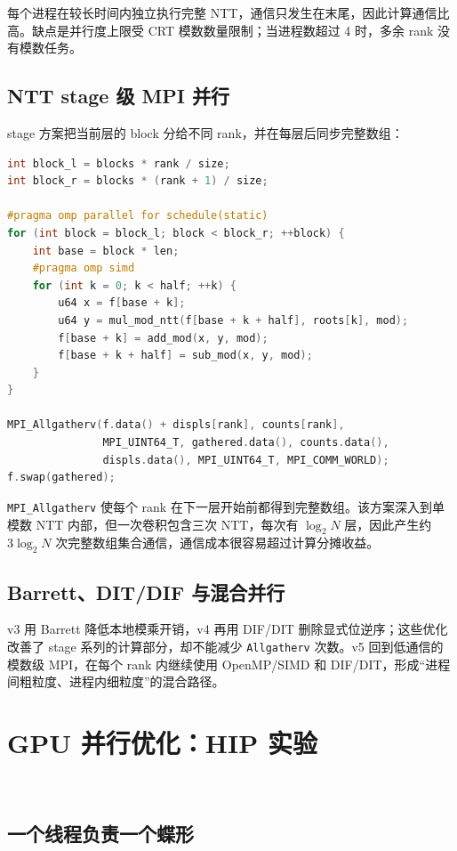 每个进程在较长时间内独立执行完整 NTT，通信只发生在末尾，因此计算通信比高。缺点是并行度上限受 CRT 模数数量限制；当进程数超过 4 时，多余 rank 没有模数任务。

\subsection{NTT stage 级 MPI 并行}

stage 方案把当前层的 block 分给不同 rank，并在每层后同步完整数组：

\begin{lstlisting}[title=stage级MPI蝶形与层间同步,label={lst:mpi-stage},language={C++}]
int block_l = blocks * rank / size;
int block_r = blocks * (rank + 1) / size;

#pragma omp parallel for schedule(static)
for (int block = block_l; block < block_r; ++block) {
    int base = block * len;
    #pragma omp simd
    for (int k = 0; k < half; ++k) {
        u64 x = f[base + k];
        u64 y = mul_mod_ntt(f[base + k + half], roots[k], mod);
        f[base + k] = add_mod(x, y, mod);
        f[base + k + half] = sub_mod(x, y, mod);
    }
}

MPI_Allgatherv(f.data() + displs[rank], counts[rank],
               MPI_UINT64_T, gathered.data(), counts.data(),
               displs.data(), MPI_UINT64_T, MPI_COMM_WORLD);
f.swap(gathered);
\end{lstlisting}

\texttt{MPI\_Allgatherv} 使每个 rank 在下一层开始前都得到完整数组。该方案深入到单模数 NTT 内部，但一次卷积包含三次 NTT，每次有 $\log_2N$ 层，因此产生约 $3\log_2N$ 次完整数组集合通信，通信成本很容易超过计算分摊收益。

\subsection{Barrett、DIT/DIF 与混合并行}

v3 用 Barrett 降低本地模乘开销，v4 再用 DIF/DIT 删除显式位逆序；这些优化改善了 stage 系列的计算部分，却不能减少 \texttt{Allgatherv} 次数。v5 回到低通信的模数级 MPI，在每个 rank 内继续使用 OpenMP/SIMD 和 DIF/DIT，形成“进程间粗粒度、进程内细粒度”的混合路径。

\section{GPU 并行优化：HIP 实验}\oldwork\ \fusionwork

\subsection{一个线程负责一个蝶形}

